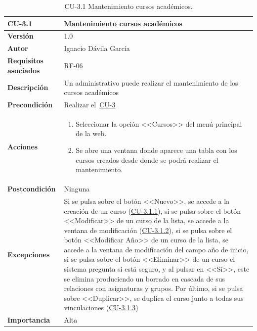 \begin{table}[p]
\label{table:CU-3.1}
	\centering
	\begin{tabularx}{\linewidth}{ p{} p{} }
		\toprule
		\textbf{CU-3.1}    & \textbf{Mantenimiento cursos académicos}\\
		\toprule
		\textbf{Versión}              & 1.0    \\
		\textbf{Autor}                & Ignacio Dávila García \\
		\textbf{Requisitos asociados} & \hyperref[itm:RF6]{RF-06} \\
		\textbf{Descripción}          & Un administrativo puede realizar el mantenimiento de los cursos académicos \\
		\textbf{Precondición}         & Realizar el~\hyperref[table:CU-3]{CU-3} \\
		\textbf{Acciones}             &
		\begin{enumerate}
			\def\labelenumi{\arabic{enumi}.}
			\tightlist
			\item Seleccionar la opción <<Cursos>> del menú principal de la web.
			\item Se abre una ventana donde aparece una tabla con los cursos creados desde donde se podrá realizar el mantenimiento.
		\end{enumerate}\\
		\textbf{Postcondición}        & Ninguna \\
		\textbf{Excepciones}          & Si se pulsa sobre el botón <<Nuevo>>, se accede a la creación de un curso (\hyperref[table:CU-3.1.1]{CU-3.1.1}), si se pulsa sobre el botón <<Modificar>> de un curso de la lista, se accede a la ventana de modificación (\hyperref[table:CU-3.1.2]{CU-3.1.2}), si se pulsa sobre el botón <<Modificar Año>> de un curso de la lista, se accede a la ventana de modificación del campo año de inicio, si se pulsa sobre el botón <<Eliminar>> de un curso el sistema pregunta si está seguro, y al pulsar en <<Sí>>, este se elimina produciendo un borrado en cascada de sus relaciones con asignaturas y grupos. Por último, si se pulsa sobre <<Duplicar>>, se duplica el curso junto a todas sus vinculaciones  (\hyperref[table:CU-3.1.3]{CU-3.1.3})\\
		\textbf{Importancia}          & Alta \\
		\bottomrule
	\end{tabularx}
	\caption{CU-3.1 Mantenimiento cursos académicos.}
\end{table}
\FloatBarrier


